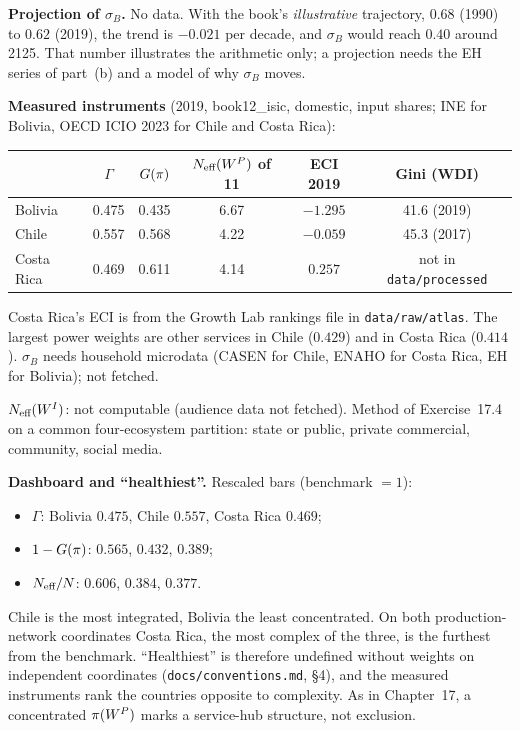 \documentclass[../solutions_manual.tex]{subfiles}
\begin{document}
 \textbf{Projection of $\sigma_B$.} No data. With the book's \emph{illustrative} trajectory, $0.68$ (1990) to $0.62$ (2019), the trend is $-0.021$ per decade, and $\sigma_B$ would reach $0.40$ around 2125. That number illustrates the arithmetic only; a projection needs the EH series of part~(b) and a model of why $\sigma_B$ moves.


 \textbf{Measured instruments} (2019, book12\_isic, domestic, input shares; INE for Bolivia, OECD ICIO 2023 for Chile and Costa Rica):
\begin{center}
\begin{tabular}{lccccc}
\toprule
& $\Gamma$ & $G(\pi)$ & $N_{\text{eff}}(W^P)$ of 11 & ECI 2019 & Gini (WDI) \\
\midrule
Bolivia & 0.475 & 0.435 & 6.67 & $-1.295$ & 41.6 (2019) \\
Chile & 0.557 & 0.568 & 4.22 & $-0.059$ & 45.3 (2017) \\
Costa Rica & 0.469 & 0.611 & 4.14 & $0.257$ & not in \nolinkurl{data/processed} \\
\bottomrule
\end{tabular}
\end{center}
Costa Rica's ECI is from the Growth Lab rankings file in \nolinkurl{data/raw/atlas}. The largest power weights are other services in Chile ($0.429$) and in Costa Rica ($0.414$). $\sigma_B$ needs household microdata (CASEN for Chile, ENAHO for Costa Rica, EH for Bolivia); not fetched.

 $N_{\text{eff}}(W^I)$: not computable (audience data not fetched). Method of Exercise~17.4 on a common four-ecosystem partition: state or public, private commercial, community, social media.

 \textbf{Dashboard and ``healthiest''.} Rescaled bars (benchmark $= 1$):
\begin{itemize}
\item $\Gamma$: Bolivia $0.475$, Chile $0.557$, Costa Rica $0.469$;
\item $1 - G(\pi)$: $0.565$, $0.432$, $0.389$;
\item $N_{\text{eff}}/N$: $0.606$, $0.384$, $0.377$.
\end{itemize}
Chile is the most integrated, Bolivia the least concentrated. On both production-network coordinates Costa Rica, the most complex of the three, is the furthest from the benchmark. ``Healthiest'' is therefore undefined without weights on independent coordinates (\nolinkurl{docs/conventions.md}, \S4), and the measured instruments rank the countries opposite to complexity. As in Chapter~17, a concentrated $\pi(W^P)$ marks a service-hub structure, not exclusion.
\end{document}
